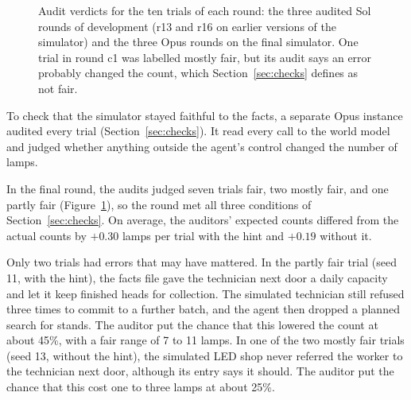 \documentclass[10pt]{article}
\begin{document}
\begin{figure}[t]
  \caption{Audit verdicts for the ten trials of each round: the three audited Sol rounds of development (r13 and r16 on earlier versions of the simulator) and the three Opus rounds on the final simulator. One trial in round c1 was labelled mostly fair, but its audit says an error probably changed the count, which Section~\ref{sec:checks} defines as not fair.}
  \label{fig:audits}
\end{figure}

To check that the simulator stayed faithful to the facts, a separate Opus instance audited every trial (Section~\ref{sec:checks}). It read every call to the world model and judged whether anything outside the agent's control changed the number of lamps.

In the final round, the audits judged seven trials fair, two mostly fair, and one partly fair (Figure~\ref{fig:audits}), so the round met all three conditions of Section~\ref{sec:checks}. On average, the auditors' expected counts differed from the actual counts by $+0.30$ lamps per trial with the hint and $+0.19$ without it.

Only two trials had errors that may have mattered. In the partly fair trial (seed 11, with the hint), the facts file gave the technician next door a daily capacity and let it keep finished heads for collection. The simulated technician still refused three times to commit to a further batch, and the agent then dropped a planned search for stands. The auditor put the chance that this lowered the count at about 45\%, with a fair range of 7 to 11 lamps. In one of the two mostly fair trials (seed 13, without the hint), the simulated LED shop never referred the worker to the technician next door, although its entry says it should. The auditor put the chance that this cost one to three lamps at about 25\%.
\end{document}
